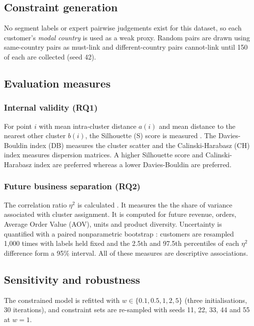 \documentclass[conference,10pt]{IEEEtran}
\newcommand{\etasq}{\eta^{2}}
\begin{document}
\subsection{Constraint generation}
No segment labels or expert pairwise judgements exist for this dataset, so
each customer's \emph{modal country} is used as a weak
proxy. Random pairs are drawn using same-country pairs as must-link and
different-country pairs cannot-link until 150 of each are collected (seed
42). 

\subsection{Evaluation measures}
\subsubsection{Internal validity (RQ1)}
For point $i$ with mean intra-cluster distance $a(i)$ and mean distance to
the nearest other cluster $b(i)$, the Silhouette (S) score is measured
\cite{rousseeuw1987silhouettes}. 
The Davies-Bouldin index (DB) measures the cluster scatter
 and the Calinski-Harabasz (CH) index \cite{ikotun2025cluster} measures
dispersion matrices. A higher Silhouette score and Calinski-Harabasz index are preferred whereas a lower Davies-Bouldin are preferred. 

\subsubsection{Future business separation (RQ2)}
The correlation ratio $\etasq$ is calculated
\cite{lakens2013calculating}. It measures the the share of variance associated with cluster assignment. It is
computed for future revenue, orders, Average Order Value (AOV), units and product diversity. Uncertainty is quantified with a paired
nonparametric bootstrap \cite{rousselet2021percentile}: customers are
resampled 1,000 times with labels held fixed and the 2.5th and 97.5th
percentiles of each $\etasq$ difference form a 95\% interval. All of these
measures are descriptive associations.

\subsection{Sensitivity and robustness}
The constrained model is refitted with $w\in\{0.1, 0.5, 1, 2,
5\}$ (three initialisations, 30 iterations), and constraint sets are
re-sampled with seeds 11, 22, 33, 44 and 55 at $w=1$.
\end{document}
